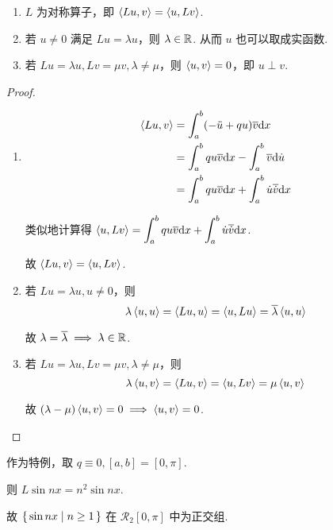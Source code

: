 \begin{property}
    \begin{enumerate}
        \item $L$ 为对称算子，即 $\left\langle{Lu,v}\right\rangle=\left\langle{u,Lv}\right\rangle$.
        
        \item 若 $u\ne 0$ 满足 $Lu=\lambda u$，则 $\lambda\in\mathbb{R}$. 从而 $u$ 也可以取成实函数.
        
        \item 若 $Lu=\lambda u,Lv=\mu v,\lambda\ne\mu$，则 $\left\langle{u,v}\right\rangle=0$，即 $u\perp v$.
    \end{enumerate}
\end{property}
\begin{proof}
    \begin{enumerate}
        \item 
$$
\begin{aligned}
    \left\langle{Lu,v}\right\rangle&=\int_a^b(-\ddot{u}+qu)\overline{v}\mathrm{d} x\\
    &=\int_a^bqu\overline{v}\mathrm{d} x-\int_a^b\overline{v}\mathrm{d}\dot{u}\\
    &=\int_a^bqu\overline{v}\mathrm{d} x+\int_a^b\dot{u}\overline{\dot{v}}\mathrm{d} x
\end{aligned}
$$

        类似地计算得 $\left\langle{u,Lv}\right\rangle=\displaystyle\int_a^bqu\overline{v}\mathrm{d} x+\int_a^b\dot{u}\overline{\dot{v}}\mathrm{d} x$.

        故 $\left\langle{Lu,v}\right\rangle=\left\langle{u,Lv}\right\rangle$.

        \item 若 $Lu=\lambda u,u\ne 0$，则
$$
\lambda\left\langle{u,u}\right\rangle=\left\langle{Lu,u}\right\rangle=\left\langle{u,Lu}\right\rangle=\overline{\lambda}\left\langle{u,u}\right\rangle
$$

        故 $\lambda=\overline{\lambda}\implies\lambda\in\mathbb{R}$.

        \item 若 $Lu=\lambda u,Lv=\mu v,\lambda\ne\mu$，则
$$
\lambda\left\langle{u,v}\right\rangle=\left\langle{Lu,v}\right\rangle=\left\langle{u,Lv}\right\rangle=\mu\left\langle{u,v}\right\rangle
$$

        故 $(\lambda-\mu)\left\langle{u,v}\right\rangle=0\implies\left\langle{u,v}\right\rangle=0$.
    \end{enumerate}
\end{proof}

作为特例，取 $q\equiv 0,[a,b]=[0,\pi]$.

则 $L\sin nx=n^2\sin nx$.

故 $\set{\sin nx|n\ge 1}$ 在 $\mathcal{R}_2[0,\pi]$ 中为正交组.


